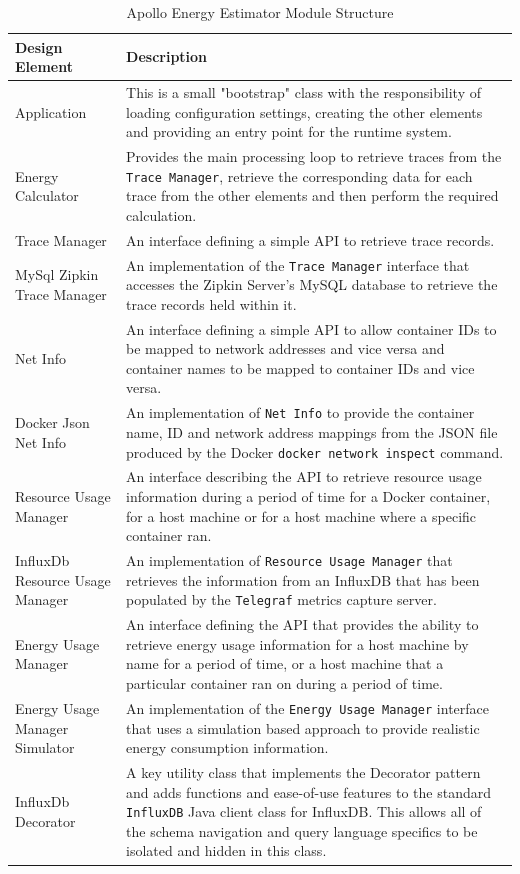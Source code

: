 \begin{table}
\centering
\caption{Apollo Energy Estimator Module Structure}
\label{table:classes}
\footnotesize
\begin{tabular}{|p{4cm}|p{9cm}|}
\hline
\textbf{Design Element} & \textbf{Description} \\
\hline
\hline
Application & This is a small "bootstrap" class with the responsibility of loading configuration settings, creating the other elements and providing an entry point for the runtime system. \\
\hline
Energy Calculator & Provides the main processing loop to retrieve traces from the \texttt{Trace Manager}, retrieve the corresponding data for each trace from the other elements and then perform the required calculation. \\
\hline
Trace Manager & An interface defining a simple API to retrieve trace records. \\
\hline
MySql Zipkin Trace Manager & An implementation of the \texttt{Trace Manager} interface that accesses the Zipkin Server's MySQL database to retrieve the trace records held within it. \\
\hline
Net Info & An interface defining a simple API to allow container IDs to be mapped to network addresses and vice versa and container names to be mapped to container IDs and vice versa. \\
\hline
Docker Json Net Info & An implementation of \texttt{Net Info} to provide the container name, ID and network address mappings from the JSON file produced by the Docker \texttt{docker network inspect} command. \\
\hline
Resource Usage Manager & An interface describing the API to retrieve resource usage information during a period of time for a Docker container, for a host machine or for a host machine where a specific container ran. \\
\hline
InfluxDb Resource Usage Manager & An implementation of \texttt{Resource Usage Manager} that retrieves the information from an InfluxDB that has been populated by the \texttt{Telegraf} metrics capture server. \\
\hline
Energy Usage Manager & An interface defining the API that provides the ability to retrieve energy usage information for a host machine by name for a period of time, or a host machine that a particular container ran on during a period of time. \\
\hline
Energy Usage Manager Simulator & An implementation of the \texttt{Energy Usage Manager} interface that uses a simulation based approach to provide realistic energy consumption information. \\
\hline
InfluxDb Decorator & A key utility class that implements the Decorator pattern and adds functions and ease-of-use features to the standard \texttt{InfluxDB} Java client class for InfluxDB.  This allows all of the schema navigation and query language specifics to be isolated and hidden in this class. \\
\hline
\end{tabular} 
\end{table}

